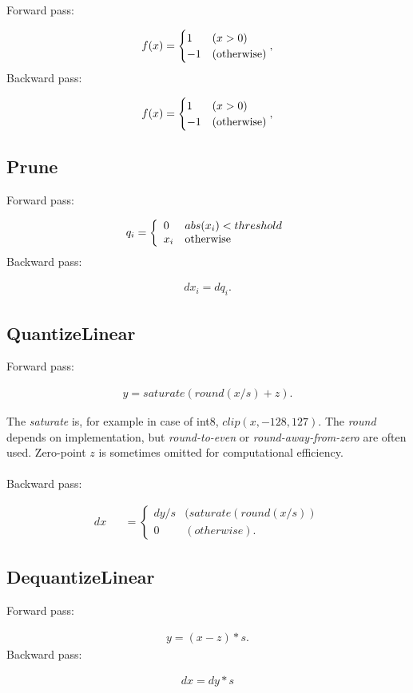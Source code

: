 \documentclass{article}
\begin{document}
Forward pass:

\begin{eqnarray}
  f(x) = \begin{cases}
    1 & (x > 0) \\
    -1 & ({\rm {\rm otherwise}})
  \end{cases},
\end{eqnarray}
%
Backward pass:

\begin{eqnarray}
  f(x) = \begin{cases}
    1 & (x > 0) \\
    -1 & ({\rm {\rm otherwise}})
  \end{cases},
\end{eqnarray}


\subsection{Prune}

Forward pass:

\begin{eqnarray}
  q_i = \left \{
  \begin{array}{ll}
    0   & abs(x_i) < threshold \\
    x_i & {\rm otherwise}
  \end{array}
  \right.
\end{eqnarray}
%
Backward pass:

\begin{eqnarray}
  dx_i = dq_i.
\end{eqnarray}


\subsection{QuantizeLinear}

Forward pass:

\begin{eqnarray}
  y = saturate(round(x / s) + z).    
\end{eqnarray}

The {\it saturate} is, for example in case of int8, $clip(x, -128, 127)$. The {\it round} depends on implementation, but {\it round-to-even} or {\it round-away-from-zero} are often used. Zero-point $z$ is sometimes omitted for computational efficiency.\\ \\
%
Backward pass:
  
\begin{eqnarray}
  dx &&= \left\{
  \begin{array}{ll}
    dy / s & (saturate(round(x / s)) \\
    0 & (otherwise).
  \end{array} \right.
\end{eqnarray}

\subsection{DequantizeLinear}

Forward pass:

\begin{eqnarray}
  y = (x - z) * s.
\end{eqnarray}
%
Backward pass:

\begin{eqnarray}
  dx = dy * s
\end{eqnarray}


% 
\end{document}
